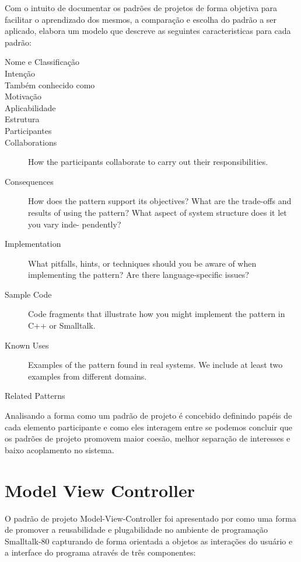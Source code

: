 Com o intuito de documentar os padrões de projetos de forma objetiva para
facilitar o aprendizado dos mesmos, a comparação e escolha do padrão a ser
aplicado,  elabora um modelo que descreve as seguintes
caracteristicas para cada padrão:

\begin{description}
\item[Nome e Classificação]
\item[Intenção]
\item[Também conhecido como]
\item[Motivação]
\item[Aplicabilidade]
\item[Estrutura]
\item[Participantes]
\item[Collaborations]
How the participants collaborate to carry out their responsibilities.
\item[Consequences]
How does the pattern support its objectives? What are the trade-offs and results
of using the pattern? What aspect of system structure does it let you vary inde-
pendently?
\item[Implementation]
What pitfalls, hints, or techniques should you be aware of when implementing
the pattern? Are there language-specific issues?
\item[Sample Code]
Code fragments that illustrate how you might implement the pattern in C++ or
Smalltalk.
\item[Known Uses]
Examples of the pattern found in real systems. We include at least two examples
from different domains.
\item[Related Patterns]
\end{description}

Analisando a forma como um padrão de projeto é concebido definindo papéis de
cada elemento participante e como eles interagem entre se podemos concluir que
os padrões de projeto promovem maior coesão, melhor separação de interesses e
baixo acoplamento no sistema.


\section*{Model View Controller}

O padrão de projeto Model-View-Controller foi apresentado por
 como uma forma de promover a reusabilidade e
plugabilidade no ambiente de programação Smalltalk-80 capturando de forma
orientada a objetos as interações do usuário e a interface do programa através
de três componentes:


